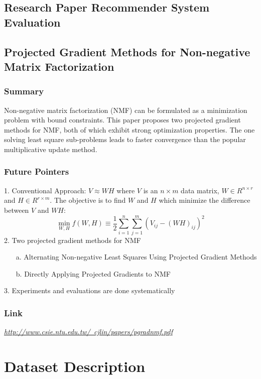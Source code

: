 \documentclass[10pt]{article}
\begin{document}
\subsection{Research Paper Recommender System Evaluation \cite{label7}}

\subsection{Projected Gradient Methods for Non-negative Matrix Factorization \cite{label8}}
	\subsubsection{Summary}
	Non-negative matrix factorization (NMF) can be formulated as a minimization problem with bound constraints. This paper proposes two projected gradient methods for NMF, both of which exhibit strong optimization properties. The one solving least square sub-problems leads to faster convergence than the popular multiplicative update method. 
	\subsubsection{Future Pointers}
	1. Conventional Approach: $V \approx WH$ where $V$ is an $n \times m$ data matrix, $W \in R^{n \times r}$ and $H \in R^{r \times m}$. The objective is to find $W$ and $H$ which minimize the difference between $V$ and $WH$:
	$$\mathop{min}_{W,H} f(W,H) \equiv \frac{1}{2} \mathop{\sum}_{i=1}^{n} \mathop{\sum}_{j=1}^{m}(V_{ij}-(WH)_{ij})^2$$
	2. Two projected gradient methods for NMF
	\begin{enumerate}
	\item[a.] Alternating Non-negative Least Squares Using Projected Gradient Methods
	\item[b.] Directly Applying Projected Gradients to NMF
	\end{enumerate}
	3. Experiments and evaluations are done systematically
	\subsubsection{Link}
	\href{http://www.csie.ntu.edu.tw/~cjlin/papers/pgradnmf.pdf}{\textit{http://www.csie.ntu.edu.tw/~cjlin/papers/pgradnmf.pdf}}

\section{Dataset Description}
\end{document}
